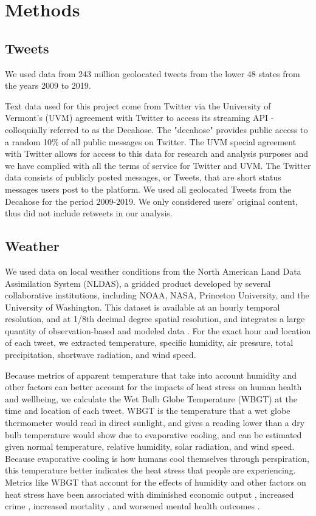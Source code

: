\documentclass{article}
\begin{document}
\section{Methods}
\subsection{Tweets}
We used data from 243 million geolocated tweets from the lower 48 states from the years 2009 to 2019.  

Text data used for this project come from Twitter via the University of Vermont’s (UVM) agreement with Twitter to access its streaming API - colloquially referred to as the Decahose. The "decahose" provides public access to a random 10\% of all public messages on Twitter. The UVM special agreement with Twitter allows for access to this data for research and analysis purposes and we have complied with all the terms of service for Twitter and UVM. 
The Twitter data consists of publicly posted messages, or Tweets, that are short status messages users post to the platform. We used all geolocated Tweets from the Decahose for the period 2009-2019. We only considered users’ original content, thus did not include retweets in our analysis.

\subsection{Weather}
We used data on local weather conditions from the North American Land Data Assimilation System (NLDAS), a gridded product developed by several collaborative institutions, including NOAA, NASA, Princeton University, and the University of Washington.  This dataset is available at an hourly temporal resolution, and at 1/8th decimal degree spatial resolution, and integrates a large quantity of observation-based and modeled data  \cite{xia_continental-scale_2012}.  For the exact hour and location of each tweet, we extracted temperature, specific humidity, air pressure, total precipitation, shortwave radiation, and wind speed.  

Because metrics of apparent temperature that take into account humidity and other factors can better account for the impacts of heat stress on human health and wellbeing, we calculate the Wet Bulb Globe Temperature (WBGT) at the time and location of each tweet.  WBGT is the temperature that a wet globe thermometer would read in direct sunlight, and gives a reading lower than a dry bulb temperature would show due to evaporative cooling, and can be estimated given normal temperature, relative humidity, solar radiation, and wind speed.  Because evaporative cooling is how humans cool themselves through perspiration, this temperature better indicates the heat stress that people are experiencing.  Metrics like WBGT that account for the effects of humidity and other factors on heat stress have been associated with diminished economic output \cite{rao2020projections}, increased crime \cite{hu2017impact}, increased mortality \cite{chien2016spatiotemporal, armstrong2019role}, and worsened mental health outcomes \cite{vida2012relationship, ding2016importance}.
\end{document}
